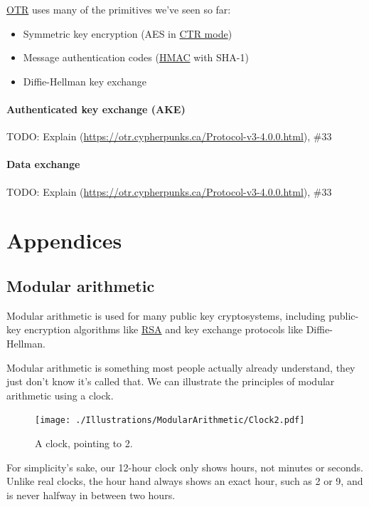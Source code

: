 \documentclass[11pt,ebook,table,dvipsnames]{memoir}
\begin{document}
\hyperref[OTR]{OTR} uses many of the primitives we've seen so far:

\begin{itemize}
\item Symmetric key encryption (\gls{AES} in \hyperref[CTR-mode]{CTR mode})
\item Message authentication codes (\hyperref[HMAC]{HMAC} with SHA-1)
\item Diffie-Hellman key exchange
\end{itemize}

\subsection{Authenticated key exchange (AKE)}
\label{sec-3-3-1-1}

TODO: Explain (\url{https://otr.cypherpunks.ca/Protocol-v3-4.0.0.html}), \#33
\subsection{Data exchange}
\label{sec-3-3-1-2}

TODO: Explain (\url{https://otr.cypherpunks.ca/Protocol-v3-4.0.0.html}), \#33
\part{Appendices}
\label{sec-4}
\appendix
\chapter{Modular arithmetic\label{Modular-arithmetic}}
\label{sec-4-1}

Modular arithmetic is used for many public key cryptosystems,
including \gls{public-key encryption} algorithms like \hyperref[RSA]{RSA} and
\gls{key exchange} protocols like Diffie-Hellman.

Modular arithmetic is something most people actually already
understand, they just don't know it's called that. We can illustrate
the principles of modular arithmetic using a clock.

\begin{figure}[ht!]
\centering
\texttt{[image: ./Illustrations/ModularArithmetic/Clock2.pdf]}
\caption{A clock, pointing to 2.}
\end{figure}

For simplicity's sake, our 12-hour clock only shows hours, not
minutes or seconds. Unlike real clocks, the hour hand always shows an
exact hour, such as 2 or 9, and is never halfway in between two
hours.
\end{document}
